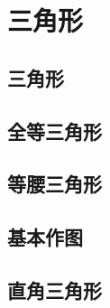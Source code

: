 \chapter{三角形}

\section{三角形}





\section{全等三角形}






\section{等腰三角形}




\section{基本作图}




\section{直角三角形}


